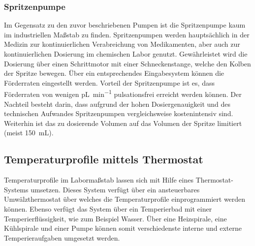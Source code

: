 \subsubsection*{Spritzenpumpe}
Im Gegensatz zu den zuvor beschriebenen Pumpen ist die Spritzenpumpe kaum im industriellen Maßstab zu finden. Spritzenpumpen werden hauptsächlich in der Medizin zur kontinuierlichen Verabreichung von Medikamenten, aber auch zur kontinuierlichen Dosierung im chemischen Labor genutzt. Gewährleistet wird die Dosierung über einen Schrittmotor mit einer Schneckenstange, welche den Kolben der Spritze bewegen. Über ein entsprechendes Eingabesystem können die Förderraten eingestellt werden. Vorteil der Spritzenpumpe ist es, dass Förderraten von wenigen \si{\pico \liter \per \minute} pulsationsfrei erreicht werden können. Der Nachteil besteht darin, dass aufgrund der hohen Dosiergenauigkeit und des technischen Aufwandes Spritzenpumpen vergleichsweise kostenintensiv sind. Weiterhin ist das zu dosierende Volumen auf das Volumen der Spritze limitiert (meist \SI{150}{\milli \liter}). \cite{Wikipedia.2020,legato_spritzenpumpe}

\subsection{Temperaturprofile mittels Thermostat}
Temperaturprofile im Labormaßstab lassen sich mit Hilfe eines Thermostat-Systems umsetzen. Dieses System verfügt über ein ansteuerbares Umwälzthermostat über welches die Temperaturprofile einprogrammiert werden können. Ebenso verfügt das System über ein  Temperierbad mit einer Temperierflüssigkeit, wie zum Beispiel Wasser. Über eine Heizspirale, eine Kühlspirale und einer Pumpe können somit verschiedenste interne und externe Temperieraufgaben umgesetzt werden.
